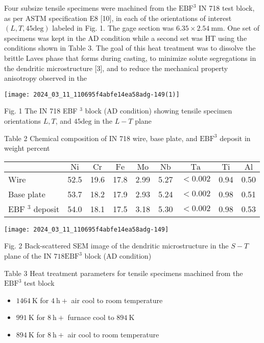 \documentclass[10pt]{article}
\begin{document}
Four subsize tensile specimens were machined from the $\mathrm{EBF}^{3}$ IN 718 test block, as per ASTM specification E8 [10], in each of the orientations of interest $(L, T, 45 \mathrm{deg})$ labeled in Fig. 1. The gage section was $6.35 \times 2.54 \mathrm{~mm}$. One set of specimens was kept in the AD condition while a second set was HT using the conditions shown in Table 3. The goal of this heat treatment was to dissolve the brittle Laves phase that forms during casting, to minimize solute segregations in the dendritic microstructure [3], and to reduce the mechanical property anisotropy observed in the

\begin{center}
\texttt{[image: 2024\_03\_11\_110695f4abfe14ea58adg-149(1)]}
\end{center}

Fig. 1 The IN 718 EBF $^{3}$ block (AD condition) showing tensile specimen orientations $L, T$, and $45 \mathrm{deg}$ in the $L-T$ plane

Table 2 Chemical composition of IN 718 wire, base plate, and $\mathrm{EBF}^{3}$ deposit in weight percent

\begin{center}
\begin{tabular}{lcccccccc}
\hline\hline
 & $\mathrm{Ni}$ & $\mathrm{Cr}$ & $\mathrm{Fe}$ & $\mathrm{Mo}$ & $\mathrm{Nb}$ & $\mathrm{Ta}$ & $\mathrm{Ti}$ & $\mathrm{Al}$ \\
\hline
Wire & 52.5 & 19.6 & 17.8 & 2.99 & 5.27 & $<0.002$ & 0.94 & 0.50 \\
Base plate & 53.7 & 18.2 & 17.9 & 2.93 & 5.24 & $<0.002$ & 0.98 & 0.51 \\
EBF $^{3}$ deposit & 54.0 & 18.1 & 17.5 & 3.18 & 5.30 & $<0.002$ & 0.98 & 0.53 \\
\hline\hline
\end{tabular}
\end{center}

\begin{center}
\texttt{[image: 2024\_03\_11\_110695f4abfe14ea58adg-149]}
\end{center}

Fig. 2 Back-scattered SEM image of the dendritic microstructure in the $S-T$ plane of the IN $718 \mathrm{EBF}^{3}$ block (AD condition)

Table 3 Heat treatment parameters for tensile specimens machined from the $\mathrm{EBF}^{3}$ test block

\begin{itemize}
  \item $1464 \mathrm{~K}$ for $4 \mathrm{~h}+$ air cool to room temperature

  \item $991 \mathrm{~K}$ for $8 \mathrm{~h}+$ furnace cool to $894 \mathrm{~K}$

  \item $894 \mathrm{~K}$ for $8 \mathrm{~h}+$ air cool to room temperature

\end{itemize}
\end{document}
